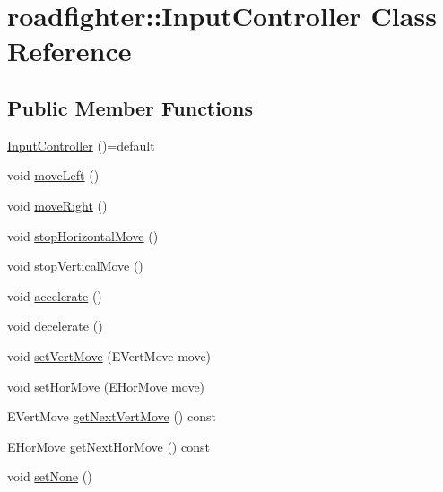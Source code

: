 \hypertarget{classroadfighter_1_1InputController}{}\section{roadfighter\+:\+:Input\+Controller Class Reference}
\label{classroadfighter_1_1InputController}
\subsection*{Public Member Functions}
\begin{DoxyCompactItemize}
\item 
\hyperlink{classroadfighter_1_1InputController_ae1647309708d4053f7f993452436c6de}{Input\+Controller} ()=default
\item 
void \hyperlink{classroadfighter_1_1InputController_a3c22763233f67e98dfbd5dc2774804f7}{move\+Left} ()
\item 
void \hyperlink{classroadfighter_1_1InputController_ae67a4ee406d64253bf62b90b766f28bb}{move\+Right} ()
\item 
void \hyperlink{classroadfighter_1_1InputController_aa5d545e2810c9b9b46b219d9baa1e32e}{stop\+Horizontal\+Move} ()
\item 
void \hyperlink{classroadfighter_1_1InputController_a9a3281103fedbc1e86dd936731209ee9}{stop\+Vertical\+Move} ()
\item 
void \hyperlink{classroadfighter_1_1InputController_a8b8656f81620db2af82d5bf9ca60fac0}{accelerate} ()
\item 
void \hyperlink{classroadfighter_1_1InputController_ab7e35b651a8b388e927a7d8d1a228f80}{decelerate} ()
\item 
void \hyperlink{classroadfighter_1_1InputController_a02d3a5d5c84eee14ff52adb92d4367cb}{set\+Vert\+Move} (E\+Vert\+Move move)
\item 
void \hyperlink{classroadfighter_1_1InputController_a1b1efa38b003c59f50dbafcd20d781e4}{set\+Hor\+Move} (E\+Hor\+Move move)
\item 
E\+Vert\+Move \hyperlink{classroadfighter_1_1InputController_a345eeddef99bff95e238f9dd822daf77}{get\+Next\+Vert\+Move} () const
\item 
E\+Hor\+Move \hyperlink{classroadfighter_1_1InputController_aef3c083d96e5478256255aa77f2d964e}{get\+Next\+Hor\+Move} () const
\item 
void \hyperlink{classroadfighter_1_1InputController_a729813bffe0b3180acc07ce54f6c7078}{set\+None} ()
\item 

\end{DoxyCompactItemize}
